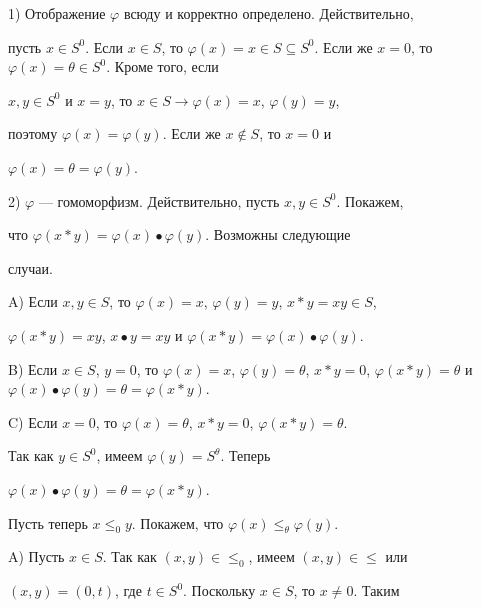  


1) Отображение $\varphi$ всюду и корректно определено. Действительно, 


пусть $x\in S^0$. Если $x\in S$, то $\varphi(x)=x\in S\subseteq 


S^0$. Если же $x=0$, то $\varphi(x)=\theta\in S^0$. Кроме того, если 


$x,y\in S^0$ и $x=y$, то $x\in S\to \varphi(x)=x$, $\varphi(y)=y$, 


поэтому $\varphi(x)=\varphi(y)$. Если же $x\notin S$, то $x=0$ и 


$\varphi(x)=\theta=\varphi(y)$. 


 


2) $\varphi$ --- гомоморфизм. Действительно, пусть $x,y\in S^0$. Покажем, 


что $\varphi(x* y)=\varphi(x)\bullet \varphi(y)$. Возможны следующие 


случаи.


 


A) Если $x,y\in S$, то $\varphi(x)=x$, $\varphi(y)=y$, $x* y=xy\in S$, 


$\varphi(x* y)=xy$, $x\bullet y=xy$ и $\varphi(x* 


y)=\varphi(x)\bullet\varphi(y)$. 


 


B) Если $x\in S$, $y=0$, то $\varphi(x)=x$, $\varphi(y)=\theta$, $x* 


y=0$, $\varphi(x* y)=\theta$ и $\varphi(x)\bullet 


\varphi(y)=\theta=\varphi(x* y)$. 


 


C) Если $x=0$, то $\varphi(x)=\theta$, $x* y=0$, $\varphi(x* y)=\theta$. 


Так как $y\in S^0$, имеем $\varphi(y)=S^\theta$. Теперь 


$\varphi(x)\bullet \varphi(y)=\theta=\varphi(x* y)$. 


 


Пусть теперь $x\le_0 y$. Покажем, что $\varphi(x)\le_\theta \varphi(y)$. 


 


A) Пусть $x\in S$. Так как $(x,y)\in\le_0$, имеем $(x,y)\in\le$ или 


$(x,y)=(0,t)$, где $t\in S^0$. Поскольку $x\in S$, то $x\ne0$. Таким 


